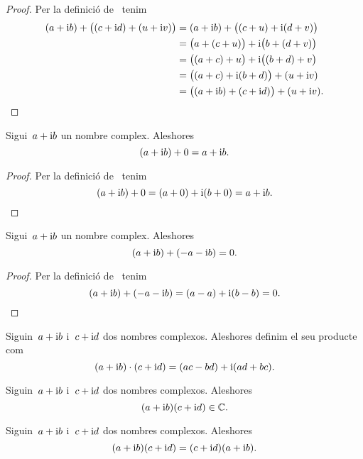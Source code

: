 \documentclass[../Apunts.tex]{subfiles}
\begin{document}
	\begin{proof}
		Per la definició de~ tenim
		\begin{align*}
			(a+\mathrm{i} b)+\big((c+\mathrm{i} d)+(u+\mathrm{i} v)\big)&=(a+\mathrm{i} b)+\big((c+u)+\mathrm{i}(d+v)\big) \\
			&=\big(a+(c+u)\big)+\mathrm{i}\big(b+(d+v)\big) \\
			&=\big((a+c)+u\big)+\mathrm{i}\big((b+d)+v\big) \\
			&=\big((a+c)+\mathrm{i}(b+d)\big)+(u+\mathrm{i} v) \\
			&=\big((a+\mathrm{i} b)+(c+\mathrm{i} d)\big)+(u+\mathrm{i} v).\qedhere
		\end{align*}
	\end{proof}
	\begin{proposition}
		\label{prop:element neutre per la suma dels complexos}
		Sigui~\(a+\mathrm{i} b\) un nombre complex. Aleshores
		\[(a+\mathrm{i} b)+0=a+\mathrm{i} b.\]
	\end{proposition}
	\begin{proof}
		Per la definició de~ tenim
		\[(a+\mathrm{i} b)+0=(a+0)+\mathrm{i}(b+0)=a+\mathrm{i} b.\qedhere\]
	\end{proof}
	\begin{proposition}
		\label{prop:element invers per la suma dels complexos}
		Sigui~\(a+\mathrm{i} b\) un nombre complex. Aleshores
		\[(a+\mathrm{i} b)+(-a-\mathrm{i} b)=0.\]
	\end{proposition}
	\begin{proof}
		Per la definició de~ tenim
		\[(a+\mathrm{i} b)+(-a-\mathrm{i} b)=(a-a)+\mathrm{i}(b-b)=0.\qedhere\]
	\end{proof}
	\begin{definition}
		\label{def:producte de nombres complexos}
		Siguin~\(a+\mathrm{i} b\) i~\(c+\mathrm{i} d\) dos nombres complexos. Aleshores definim el seu producte com
		\[(a+\mathrm{i} b)\cdot(c+\mathrm{i} d)=(ac-bd)+\mathrm{i}(ad+bc).\]
	\end{definition}
	\begin{observation}
		\label{obs:els nombres complexos estan tancats pel producte}
		Siguin~\(a+\mathrm{i} b\) i~\(c+\mathrm{i} d\) dos nombres complexos. Aleshores
		\[(a+\mathrm{i} b)(c+\mathrm{i} d)\in\mathbb{C}.\]
	\end{observation}
	\begin{proposition}
		\label{prop:els nombres complexos commuten pel producte}
		Siguin~\(a+\mathrm{i} b\) i~\(c+\mathrm{i} d\) dos nombres complexos. Aleshores
		\[(a+\mathrm{i} b)(c+\mathrm{i} d)=(c+\mathrm{i} d)(a+\mathrm{i} b).\]
	\end{proposition}
\end{document}
